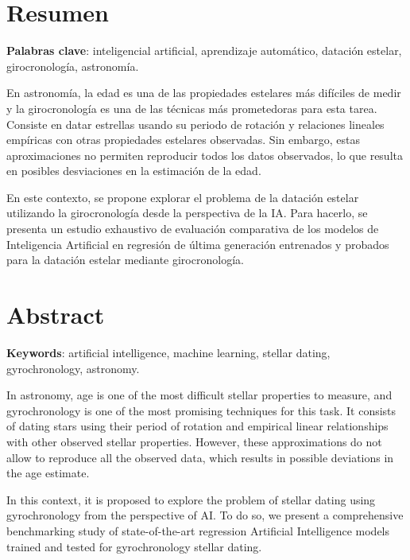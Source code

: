 \chapter{Resumen}

\vspace{0.5cm}

\textbf{Palabras clave}: inteligencial artificial, aprendizaje automático, datación estelar, girocronología, astronomía.

En astronomía, la edad es una de las propiedades estelares más difíciles de medir y la girocronología es una de las técnicas más prometedoras para esta tarea. Consiste en datar estrellas usando su periodo de rotación y relaciones lineales empíricas con otras propiedades estelares observadas. Sin embargo, estas aproximaciones no permiten reproducir todos los datos observados, lo que resulta en posibles desviaciones en la estimación de la edad.

En este contexto, se propone explorar el problema de la datación estelar utilizando la girocronología desde la perspectiva de la IA. Para hacerlo, se presenta un estudio exhaustivo de evaluación comparativa de los modelos de Inteligencia Artificial en regresión de última generación entrenados y probados para la datación estelar mediante girocronología.

\newpage
\thispagestyle{empty}
\hspace*{0.5cm}
\newpage

\chapter{Abstract}

\vspace{0.5cm}

\textbf{Keywords}: artificial intelligence, machine learning, stellar dating, gyrochronology, astronomy.

In astronomy, age is one of the most difficult stellar properties to measure, and gyrochronology is one of the most promising techniques for this task. It consists of dating stars using their period of rotation and empirical linear relationships with other observed stellar properties. However, these approximations do not allow to reproduce all the observed data, which results in possible deviations in the age estimate.

In this context, it is proposed to explore the problem of stellar dating using gyrochronology from the perspective of AI. To do so, we present a comprehensive benchmarking study of state-of-the-art regression Artificial Intelligence models trained and tested for gyrochronology stellar dating. 

\newpage
\thispagestyle{empty}
\hspace*{0.5cm}
\newpage